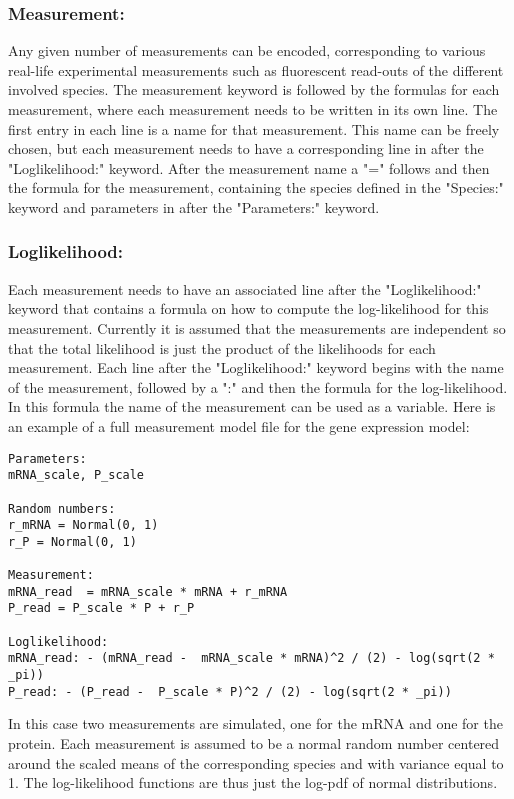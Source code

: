 \documentclass[11pt]{article} %
\begin{document}
\subsubsection{Measurement:}
Any given number of measurements can be encoded, corresponding to various real-life experimental measurements such as fluorescent read-outs of the different involved species. The measurement keyword is followed by the formulas for each measurement, where each measurement needs to be written in its own line. The first entry in each line is a name for that measurement. This name can be freely chosen, but each measurement needs to have a corresponding line in after the "Loglikelihood:" keyword. After the measurement name a "=" follows and then the formula for the measurement, containing the species defined in the "Species:" keyword and parameters in after the "Parameters:" keyword. 

\subsubsection{Loglikelihood:}
Each measurement needs to have an associated line after the "Loglikelihood:" keyword that contains a formula on how to compute the log-likelihood for this measurement. Currently it is assumed that the measurements are independent so that the total likelihood is just the product of the likelihoods for each measurement. Each line after the "Loglikelihood:" keyword begins with the name of the measurement, followed by a ":" and then the formula for the log-likelihood. In this formula the name of the measurement can be used as a variable. 
Here is an example of a full measurement model file for the gene expression model:

\begin{verbatim}
Parameters:
mRNA_scale, P_scale

Random numbers:
r_mRNA = Normal(0, 1)
r_P = Normal(0, 1)

Measurement:
mRNA_read  = mRNA_scale * mRNA + r_mRNA
P_read = P_scale * P + r_P

Loglikelihood:
mRNA_read: - (mRNA_read -  mRNA_scale * mRNA)^2 / (2) - log(sqrt(2 * _pi))
P_read: - (P_read -  P_scale * P)^2 / (2) - log(sqrt(2 * _pi))

\end{verbatim}
In this case two measurements are simulated, one for the mRNA and one for the protein. Each measurement is assumed to be a normal random number centered around the scaled means of the corresponding species and with variance equal to 1. The log-likelihood functions are thus just the log-pdf of normal distributions.
%




\end{document}
